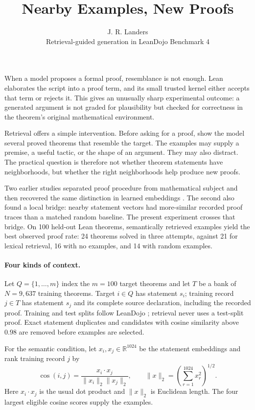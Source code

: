 \documentclass[11pt]{article}
\title{\vspace{-1.6em}\textbf{Nearby Examples, New Proofs}\vspace{-0.5em}}
\author{J. R. Landers\\[-1pt]\small Retrieval-guided generation in LeanDojo Benchmark 4}
\date{\vspace{-1.2em}}
\begin{document}
\maketitle
\vspace{-1.6em}

When a model proposes a formal proof, resemblance is not enough.  Lean elaborates the script
into a proof term, and its small trusted kernel either accepts that term or rejects it.  This gives
an unusually sharp experimental outcome: a generated argument is not graded for plausibility but
checked for correctness in the theorem's original mathematical environment.

Retrieval offers a simple intervention.  Before asking for a proof, show the model several proved
theorems that resemble the target.  The examples may supply a premise, a useful tactic, or the shape
of an argument.  They may also distract.  The practical question is therefore not whether theorem
statements have neighborhoods, but whether the right neighborhoods help produce new proofs.

Two earlier studies separated proof procedure from mathematical subject and then recovered the same
distinction in learned embeddings \cite{textures,geometry}.  The second also found a local bridge:
nearby statement vectors had more-similar recorded proof traces than a matched random baseline.
The present experiment crosses that bridge.  On 100 held-out Lean theorems, semantically retrieved
examples yield the best observed proof rate: 24 theorems solved in three attempts, against 21 for
lexical retrieval, 16 with no examples, and 14 with random examples.

\paragraph{Four kinds of context.}
Let $Q=\{1,\ldots,m\}$ index the $m=100$ target theorems and let $T$ be a bank of
$N=9{,}637$ training theorems.  Target $i\in Q$ has statement $s_i$; training record
$j\in T$ has statement $s_j$ and its complete source declaration, including the recorded proof.
Training and test splits follow LeanDojo \cite{leandojo}; retrieval never uses a test-split proof.
Exact statement duplicates and candidates with cosine
similarity above $0.98$ are removed before examples are selected.

For the semantic condition, let $x_i,x_j\in\mathbb{R}^{1024}$ be the statement embeddings and
rank training record $j$ by
\[
 \operatorname{cos}(i,j)=
 \frac{x_i\mathbin{\cdot}x_j}{\lVert x_i\rVert_2\lVert x_j\rVert_2},
 \qquad
 \lVert x\rVert_2=\left(\sum_{r=1}^{1024}x_r^2\right)^{1/2}.
\]
Here $x_i\mathbin{\cdot}x_j$ is the usual dot product and $\lVert x\rVert_2$ is Euclidean length.
The four largest eligible cosine scores supply the examples.
\end{document}
